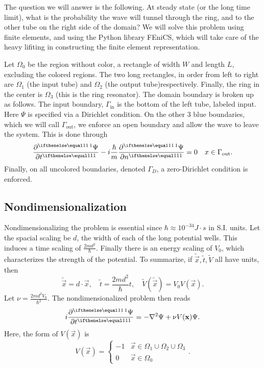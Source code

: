 \documentclass[../../main.tex]{subfiles}
\begin{document}
The question we will answer is the following.
At steady state (or the long time limit), what is the probability
the wave will tunnel through the ring, and to the other tube on 
the right side of the domain? 
We will solve this problem using finite elements, and using 
the Python library FEniCS, which will take care of the heavy lifiting
in constructing the finite element representation.

Let $\Omega_0$ be the region without color, a rectangle of width 
$W$ and length $L$, excluding the colored regions.
The two long rectangles, in order from left to right are $\Omega_1$ 
(the input tube) and 
$\Omega_2$ (the output tube)respectively.  
Finally, the ring in the center is 
$\Omega_3$ (this is the ring resonator).
The domain boundary is broken up as follows.  
The input boundary, $\Gamma_\mathrm{in}$ is the bottom of the left
tube, labeled input.  
Here $\Psi$ is specified via a Dirichlet condition.
On the other 3 blue boundaries, which we will call 
$\Gamma_\mathrm{out}$, we enforce an open boundary and 
allow the wave to leave the system.
This is done through
\[
		\pder{\Psi}{t} - i\frac{\hbar}{m} \pder{\Psi}{n} = 0 \quad 
		x \in \Gamma_\mathrm{out}
.\] 
Finally, on all uncolored boundaries, denoted 
$\Gamma_D$, a zero-Dirichlet condition is enforced.




\subsection{Nondimensionalization}

Nondimensionalizing the problem is essential since 
$\hbar \approx 10^{-34} J \cdot s$ in S.I. units.  
Let the spacial scaling be $d$, the width of each of the long potential 
wells.  
This induces a time scaling of 
$\frac{2m d^2}{\hbar}$.  
Finally there is an energy scaling of $V_0$, which characterizes the 
strength of the potential.
To summarize, 
if $\tilde{\vec x}, \tilde t, \tilde V$ all have units, then
\begin{equation}
		\label{eq:nd}
		\tilde{\vec x} = d \cdot \vec x, \quad 
		\tilde t = \frac{2m d^2}{\hbar} t, \quad 
		\tilde V(\tilde{\vec x}) = V_0 V(\vec x)
.\end{equation}
Let $\nu = \frac{2md^2 V_0}{\hbar^2}$.  
The nondimensionalized problem then reads
\begin{equation}
		\label{eq:schrodinger-nondim}
		i \pder{\Psi}{t} = -\nabla^2 \Psi + \nu V(\vec x) \Psi
.\end{equation}
Here, the form of $V(\vec x)$ is 
\begin{equation}
		\label{eq:potential-nondim}
		V(\vec x) = 
		\begin{cases}
				-1 & \vec x \in \Omega_1 \cup \Omega_2 \cup \Omega_3 \\
				0 & \vec x \in \Omega_0
		\end{cases}
.\end{equation}
\end{document}
